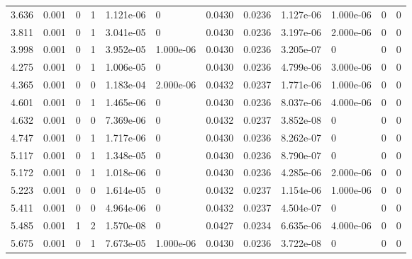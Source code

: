 \documentclass[preview]{standalone}
\begin{document}
{{\begin{tabular}{L{1.2cm}C{1.2cm} C{0.3cm}C{0.5cm} C{1.4cm}C{1.4cm} C{1.4cm}C{1.4cm} C{1.6cm}C{1.6cm} C{1.6cm}C{1.6cm}}
  3.636  &  0.001  & 0     &  1 &  1.121e-06  & 0  &  0.0430&   0.0236& 1.127e-06 & 1.000e-06   &  0 & 0  \\ 
  3.811  &  0.001  & 0     &  1 &  3.041e-05  & 0  &  0.0430&   0.0236& 3.197e-06 & 2.000e-06   &  0 & 0  \\ 
  3.998  &  0.001  & 0     &  1 &  3.952e-05  & 1.000e-06  &  0.0430&   0.0236& 3.205e-07 & 0   &  0 & 0  \\ 
  4.275  &  0.001  & 0     &  1 &  1.006e-05  & 0  &  0.0430&   0.0236& 4.799e-06 & 3.000e-06   &  0 & 0  \\ 
  4.365  &  0.001  & 0     &  0 &  1.183e-04  & 2.000e-06  &  0.0432&   0.0237& 1.771e-06 & 1.000e-06   &  0 & 0  \\ 
  4.601  &  0.001  & 0     &  1 &  1.465e-06  & 0  &  0.0430&   0.0236& 8.037e-06 & 4.000e-06   &  0 & 0  \\ 
  4.632  &  0.001  & 0     &  0 &  7.369e-06  & 0  &  0.0432&   0.0237& 3.852e-08 & 0   &  0 & 0  \\ 
  4.747  &  0.001  & 0     &  1 &  1.717e-06  & 0  &  0.0430&   0.0236& 8.262e-07 & 0   &  0 & 0  \\ 
  5.117  &  0.001  & 0     &  1 &  1.348e-05  & 0  &  0.0430&   0.0236& 8.790e-07 & 0   &  0 & 0  \\ 
  5.172  &  0.001  & 0     &  1 &  1.018e-06  & 0  &  0.0430&   0.0236& 4.285e-06 & 2.000e-06   &  0 & 0  \\ 
  5.223  &  0.001  & 0     &  0 &  1.614e-05  & 0  &  0.0432&   0.0237& 1.154e-06 & 1.000e-06   &  0 & 0  \\ 
  5.411  &  0.001  & 0     &  0 &  4.964e-06  & 0  &  0.0432&   0.0237& 4.504e-07 & 0   &  0 & 0  \\ 
  5.485  &  0.001  & 1     &  2 &  1.570e-08  & 0  &  0.0427&   0.0234& 6.635e-06 & 4.000e-06   &  0 & 0  \\ 
  5.675  &  0.001  & 0     &  1 &  7.673e-05  & 1.000e-06  &  0.0430&   0.0236& 3.722e-08 & 0   &  0 & 0  \\ 
\hline 
\end{tabular} 

}}
\end{document}
